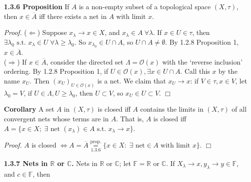 \documentclass[12pt]{article}
\newcommand{\st}[0]{ \textrm{ s.t. } }
\newcommand{\rimply}[0] { \Rightarrow }
\newcommand{\limply}[0] { \Leftarrow }
\newcommand{\lrimply}[0] { \Leftrightarrow }
\newcommand{\rarw}[0] { \rightarrow }
\newcommand{\reals}[0] { \mathbb{R}}
\newcommand{\scalars}[0] { \mathbb{F}}
\newcommand{\Cdb}[0] { \mathbb{C}}
\newcommand{\curlyO}[0] { \mathcal{O} }
\begin{document}
\begin{flushleft} {\bf 1.3.6 Proposition} If $A$ is a non-empty subset of a topological
space $(X, \tau)$, then $x \in \overline{A}$ iff there exists a net in $A$ with limit
 $x$.
\end{flushleft}

\begin{flushleft} \emph{Proof. } ($\limply$) Suppose $x_\lambda \rarw x \in X$,
 and $x_\lambda \in A \; \forall \lambda$.  If $x \in U \in \tau$, then $\exists
 \lambda_0 \st x_\lambda \in U \; \forall \lambda \ge \lambda_0$. So
  $x_{\lambda_0} \in U \cap A$, so $U \cap A \not = \emptyset$. By 1.2.8 Proposition 1,
  $x \in \overline{A}$.  \\
($\rimply$) If $x \in \overline{A}$, consider the directed set
$\Lambda = \curlyO(x)$ with the `reverse inclusion' ordering. By
1.2.8 Proposition 1, if $U \in \curlyO(x), \exists x \in U \cap A$.
  Call this $x$ by the name $x_U$. Then $(x_U) _ { U \in \curlyO(x)}$ is a net.
  We claim that $x_U \rarw x$: if $V
\in \tau, x \in V$,
 let $\lambda_0 = V$, if $U \in \Lambda, U  \ge \lambda_0$,
 then $U \subset  V$, so $x_U \in U \subset V$. $\Box$
\end{flushleft}


\begin{flushleft} {\bf Corollary} A set $A$ in $(X, \tau)$ is closed iff $A$ contains the limits in $(X, \tau)$ of all convergent nets whose terms are in $A$. That is, $A$ is closed iff $A = \{ x \in X; \; \exists \textrm{ net } (x_\lambda) \in A \st x_\lambda \rarw x \}$.
\end{flushleft}

\begin{flushleft} \emph{Proof. } $A$ is closed $\lrimply A = \overline{A}
 \underset{1.3.6}{\overset{\textrm{prop.} }{=}} \{ x \in X :  \; \exists \textrm{ net} \in A \textrm{ with limit } x\} $. $\Box$
\end{flushleft}

{\bf   1.3.7 Nets in $\reals$ or $\Cdb$.}
Nets in $\reals$ or $\Cdb$; let $\scalars = \reals$ or $\Cdb$. If $X_\lambda \rarw x, y_\lambda \rarw y \in \scalars$, and $c \in \scalars$, then
\end{document}

